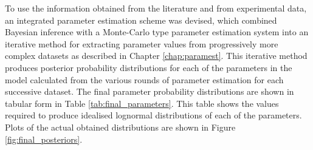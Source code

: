 To use the information obtained from the literature and from experimental data, an integrated parameter estimation scheme was devised, which combined Bayesian inference with a Monte-Carlo type parameter estimation system into an iterative method for extracting parameter values from progressively more complex datasets as described in Chapter \ref{chap:paramest}. This iterative method produces posterior probability distributions for each of the parameters in the model calculated from the various rounds of parameter estimation for each successive dataset. The final parameter probability distributions are shown in tabular form in Table \ref{tab:final_parameters}. This table shows the values required to produce idealised lognormal distributions of each of the parameters. Plots of the actual obtained distributions are shown in Figure \ref{fig:final_posteriors}.
